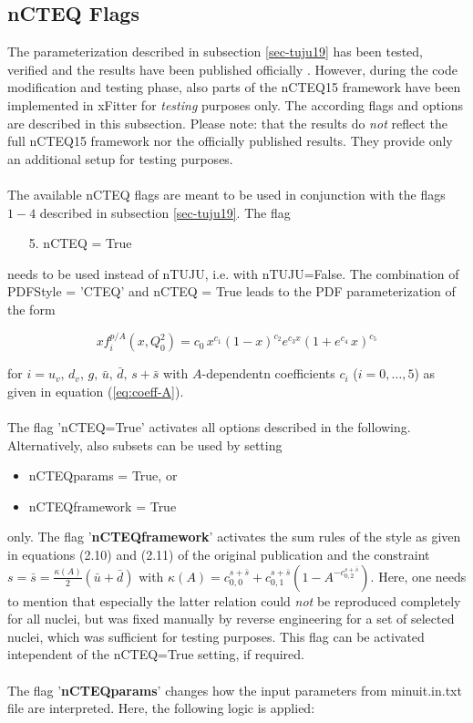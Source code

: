 \documentclass{article}
\begin{document}
\subsection{nCTEQ Flags}

The parameterization described in subsection \ref{sec-tuju19} has been tested, verified and the results have been published officially \cite{Walt:2019slu}. However, during the code modification and testing phase, also parts of the nCTEQ15 framework \cite{Kovarik:2015cma} have been implemented in xFitter for \textit{testing} purposes only. The according flags and options are described in this subsection. Please note: that the results do \textit{not} reflect the full nCTEQ15 framework nor the officially published results. They provide only an additional setup for testing purposes. \\
\\
The available nCTEQ flags are meant to be used in conjunction with the flags $1-4$ described in subsection \ref{sec-tuju19}. The flag 
\begin{enumerate}
\item[5.] nCTEQ = True 
\end{enumerate}

\noindent needs to be used instead of nTUJU, i.e. with nTUJU=False. The combination of PDFStyle = 'CTEQ' and nCTEQ = True leads to the PDF parameterization of the form

\begin{equation}
xf^{p/A}_i\left(x,Q_0^2 \right) = c_0\,x^{c_1} (1-x)^{c_2} e^{c_3 x}\left(1+e^{c_4}\,x \right)^{c_5}
\end{equation}

\noindent for $i=u_v,\,d_v,\,g,\,\bar{u},\,\bar{d},\,s+\bar{s}$ with $A$-dependentn coefficients $c_i$ ($i=0,\dots,5$) as given in equation (\ref{eq:coeff-A}).\\
\\
\noindent The flag 'nCTEQ=True' activates all options described in the following. Alternatively, also subsets can be used by setting
\begin{itemize}
\item nCTEQparams = True, or
\item nCTEQframework = True
\end{itemize}

\noindent only. The flag '\textbf{nCTEQframework}' activates the sum rules of the style as given in equations (2.10) and (2.11) of the original publication \cite{Kovarik:2015cma} and the constraint $s=\bar{s}=\frac{\kappa(A)}{2} \left( \bar{u}+\bar{d} \right)$ with $\kappa(A)=c^{s+\bar{s}}_{0,0}+c^{s+\bar{s}}_{0,1}\left(1-A^{-c^{s+\bar{s}}_{0,2}}\right)$. Here, one needs to mention that especially the latter relation could \textit{not} be reproduced completely for all nuclei, but was fixed manually by reverse engineering for a set of selected nuclei, which was sufficient for testing purposes. This flag can be activated intependent of the nCTEQ=True setting, if required.\\
\\
The flag '\textbf{nCTEQparams}' changes how the input parameters from minuit.in.txt file are interpreted. Here, the following logic is applied:\\
\end{document}
